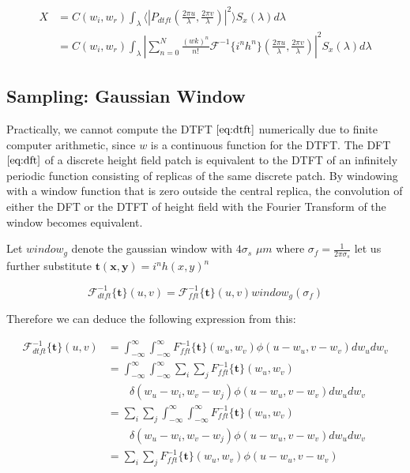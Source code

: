 \begin{align}
X 
& = C(w_i,w_r) \int_{\lambda} \langle \left|P_{dtft}(\frac{2\pi u}{\lambda}, \frac{2\pi v}{\lambda})\right|^2\rangle S_x(\lambda)d\lambda \nonumber \\
& = C(w_i,w_r) \int_{\lambda} \left| \sum_{n=0}^N \frac{(wk)^n}{n!} \mathcal{F}^{-1}\{i^n h^n\}(\frac{2\pi u}{\lambda}, \frac{2\pi v}{\lambda})\right|^2 S_x(\lambda)d\lambda
\label{eq:xcolexpression}
\end{align}

\subsection{Sampling: Gaussian Window}
\label{sec:gaussianwindow}
Practically, we cannot compute the DTFT $\ref{eq:dtft}$ numerically due to finite computer arithmetic, since $w$ is a continuous function for the DTFT. The DFT $\ref{eq:dft}$ of a discrete height field patch is equivalent to the DTFT of an infinitely periodic function consisting of replicas of the same discrete patch. By windowing with a window function that is zero outside the central replica, the convolution of either the DFT or the DTFT of height field with the Fourier Transform of the window becomes equivalent.

Let $window_g$ denote the gaussian window with $4\sigma_s$ $\mu m$ where $\sigma_f = \frac{1}{2\pi\sigma_s}$
let us further substitute $\mathbf{t(x,y)}=i^n h(x,y)^n$

\begin{equation}
\mathcal{F}_{dtft}^{-1}\{\mathbf{t}\}(u,v) = \mathcal{F}_{fft}^{-1}\{\mathbf{t}\}(u,v)window_g(\sigma_f)
\end{equation} 

Therefore we can deduce the following expression from this:

\begin{align}
\mathcal{F}_{dtft}^{-1}\{\mathbf{t}\}(u,v)
& = \int_{-\infty}^{\infty} \int_{-\infty}^{\infty} {F}_{fft}^{-1}\{\mathbf{t}\}(w_u,w_v) \phi(u-w_u, v-w_v) dw_u dw_v \nonumber \\
& = \int_{-\infty}^{\infty} \int_{-\infty}^{\infty} \sum_i \sum_j {F}_{fft}^{-1}\{\mathbf{t}\}(w_u,w_v) \nonumber \\ 
& \quad \quad \delta(w_u-w_i, w_v-w_j)\phi(u-w_u, v-w_v) dw_u dw_v \nonumber \\
& = \sum_i \sum_j \int_{-\infty}^{\infty} \int_{-\infty}^{\infty}  {F}_{fft}^{-1}\{\mathbf{t}\}(w_u,w_v) \nonumber \\
& \quad \quad \delta(w_u-w_i, w_v-w_j)\phi(u-w_u, v-w_v) dw_u dw_v \nonumber \\
& = \sum_i \sum_j {F}_{fft}^{-1}\{\mathbf{t}\}(w_u,w_v) \phi(u-w_u, v-w_v)
\end{align}

